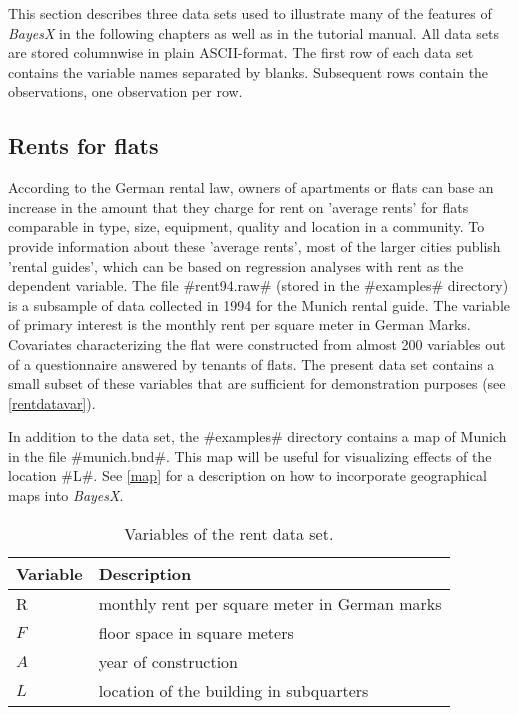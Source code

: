 This section describes three data sets used to illustrate many of
the features of {\em BayesX} in the following chapters as well as
in the tutorial manual. All data sets are stored columnwise in
plain ASCII-format. The first row of each data set contains the
variable names separated by blanks. Subsequent rows contain the
observations, one observation per row.

\subsection{Rents for flats}
\label{rentdata}  

According to the German rental law, owners of apartments or flats
can base an increase in the amount that they charge for rent on
'average rents' for flats comparable in type, size, equipment,
quality and location in a community. To provide information about
these 'average rents', most of the larger cities publish 'rental
guides', which can be based on regression analyses with rent as
the dependent variable. The file #rent94.raw# (stored in the
#examples# directory) is a subsample of data collected in 1994 for
the Munich rental guide. The variable of primary interest is the
monthly rent per square meter in German Marks. Covariates
characterizing the flat were constructed from almost 200 variables
out of a questionnaire answered by tenants of flats. The present
data set contains a small subset of these variables that are
sufficient for demonstration purposes (see \autoref{rentdatavar}).

In addition to the data set, the #examples# directory contains a
map of Munich in the file #munich.bnd#. This map will be useful
for visualizing effects of the location #L#. See \autoref{map} for
a description on how to incorporate geographical maps into {\em
BayesX}.

\begin{table}

\centering
\begin{tabular}{|l|l|}
\hline
{\bf Variable} & {\bf Description} \\
\hline
R & monthly rent per square meter in German marks \\
$F$ & floor space in square meters \\
$A$ & year of construction \\
$L$ & location of the building in subquarters \\
 \hline
\end{tabular}
{\em \caption{\label{rentdatavar}Variables of the rent data set.}}
\end{table}


